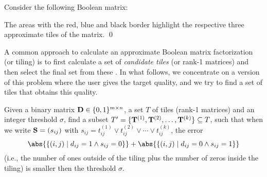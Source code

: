 \begin{example}\label{ex:tiling}
Consider the following Boolean matrix: 
\begin{center}
\end{center}
The areas with the red, blue and black border highlight the respective three approximate tiles of the matrix. \qed
\end{example}

A common approach to calculate an approximate Boolean matrix factorization (or tiling) is to first calculate a set of \emph{candidate tiles} (or rank-1 matrices) and then select the final set from these \parencite{dbp,tyukin14bmad}. In what follows, we concentrate on a version of this problem where the user gives the target quality, and we try to find a set of tiles that obtains  this quality. 


\begin{definition}
  \label{def:probtile}
Given a binary matrix $\mathbf{D}\in\{0,1\}^{m\times n}$, a set $T$ of tiles (rank-1 matrices) and an integer threshold $\sigma$, find a subset $T' = \{\mathbf{T}^{(1)}, \mathbf{T}^{(2)}, \ldots, \mathbf{T}^{(k)}\}\subseteq T$, such that when we write $\mathbf{S} = (s_{ij})$ with $s_{ij} = t^{(1)}_{ij} \lor t^{(2)}_{ij} \lor \cdots \lor t^{(k)}_{ij}$,
the error
\begin{equation}\label{eq:probtile_err}
  \abs{\{(i, j)\mid d_{ij} = 1 \land s_{ij} = 0\}} + \abs{\{(i, j) \mid d_{ij} = 0 \land s_{ij} = 1\}}
\end{equation}
(i.e., the number of ones outside of the tiling plus the number of zeros inside the tiling) is smaller then the threshold $\sigma$.
\end{definition}

